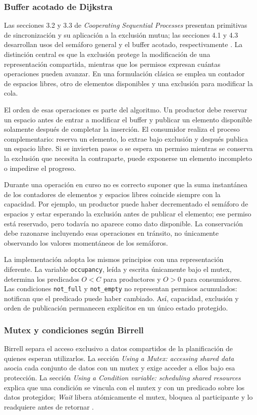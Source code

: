 \documentclass[conference]{IEEEtran}
\begin{document}
\subsubsection{Buffer acotado de Dijkstra}
Las secciones 3.2 y 3.3 de \textit{Cooperating Sequential Processes} presentan primitivas de sincronización y su aplicación a la exclusión mutua; las secciones 4.1 y 4.3 desarrollan usos del semáforo general y el buffer acotado, respectivamente \cite{dijkstra}. La distinción central es que la exclusión protege la modificación de una representación compartida, mientras que los permisos expresan cuántas operaciones pueden avanzar. En una formulación clásica se emplea un contador de espacios libres, otro de elementos disponibles y una exclusión para modificar la cola.

El orden de esas operaciones es parte del algoritmo. Un productor debe reservar un espacio antes de entrar a modificar el buffer y publicar un elemento disponible solamente después de completar la inserción. El consumidor realiza el proceso complementario: reserva un elemento, lo extrae bajo exclusión y después publica un espacio libre. Si se invierten pasos o se espera un permiso mientras se conserva la exclusión que necesita la contraparte, puede exponerse un elemento incompleto o impedirse el progreso.

Durante una operación en curso no es correcto suponer que la suma instantánea de los contadores de elementos y espacios libres coincide siempre con la capacidad. Por ejemplo, un productor puede haber decrementado el semáforo de espacios y estar esperando la exclusión antes de publicar el elemento; ese permiso está reservado, pero todavía no aparece como dato disponible. La conservación debe razonarse incluyendo esas operaciones en tránsito, no únicamente observando los valores momentáneos de los semáforos.

La implementación adopta los mismos principios con una representación diferente. La variable \texttt{occupancy}, leída y escrita únicamente bajo el mutex, determina los predicados $O<C$ para productores y $O>0$ para consumidores. Las condiciones \texttt{not\_full} y \texttt{not\_empty} no representan permisos acumulados: notifican que el predicado puede haber cambiado. Así, capacidad, exclusión y orden de publicación permanecen explícitos en un único estado protegido.

\subsubsection{Mutex y condiciones según Birrell}
Birrell separa el acceso exclusivo a datos compartidos de la planificación de quienes esperan utilizarlos. La sección \textit{Using a Mutex: accessing shared data} asocia cada conjunto de datos con un mutex y exige acceder a ellos bajo esa protección. La sección \textit{Using a Condition variable: scheduling shared resources} explica que una condición se vincula con el mutex y con un predicado sobre los datos protegidos; \textit{Wait} libera atómicamente el mutex, bloquea al participante y lo readquiere antes de retornar \cite{birrell}.
\end{document}
